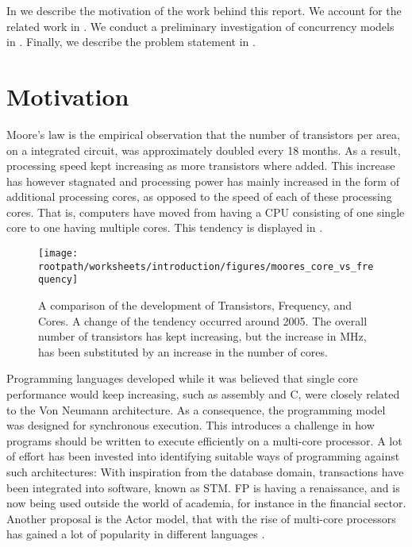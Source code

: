 \makeatletter {}\makeatother
{}
In  we describe the motivation of the work behind this report. We account for the related work in . We conduct a preliminary investigation of concurrency models in . Finally, we describe the problem statement in .
\label{chap:intro}

\section{Motivation}
Moore's law\cite{moore1965cramming} is the empirical observation that the number of transistors per area, on a integrated circuit, was approximately doubled every 18 months\cite[p. 203]{mack2011fifty}. As a result, processing speed kept increasing as more transistors where added. This increase has however stagnated and processing power has mainly increased in the form of additional processing cores, as opposed to the speed of each of these processing cores\cite[p. 22]{sevenModels}. That is, computers have moved from having a \ac{CPU} consisting of one single core to one having multiple cores. This tendency is displayed in . 
\label{sec:motivation}

\begin{figure}[htbp]
\centering
 \texttt{[image: \\rootpath/worksheets/introduction/figures/moores\_core\_vs\_frequency]} 
 \caption{A comparison of the development of Transistors, Frequency, and Cores\cite{isca2009}. A change of the tendency occurred around 2005. The overall number of transistors has kept increasing, but the increase in MHz, has been substituted by an increase in the number of cores.}
\label{fig:moores_in_reality}
\end{figure}

Programming languages developed while it was believed that single core performance would keep increasing, such as assembly and C, were closely related to the Von Neumann architecture. As a consequence, the programming model was designed for synchronous execution. This introduces a challenge in how programs should be written to execute efficiently on a multi-core processor. A lot of effort has been invested into identifying suitable ways of programming against such architectures: With inspiration from the database domain, transactions have been integrated into software, known as \ac{STM}\cite{shavit1997software}\cite{scherer2005advanced}. \ac{FP} is having a renaissance, and is now being used outside the world of academia, for instance in the financial sector\cite{minsky2008caml}. Another proposal is the Actor model\cite{hewitt1973universal}, that with the rise of multi-core processors has gained a lot of popularity in different languages  \cite{haller2007actors}\cite{hewitt2014actor}. 

